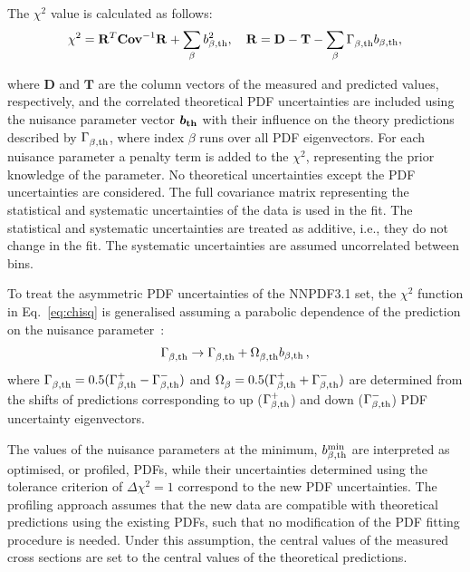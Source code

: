 \documentclass[pdftex,twocolumn,epjc3]{svjour3}          %
\newcommand{\nnpdf} {NNPDF3.1\xspace}
\newcommand{\chisq}{\ensuremath{\chi^2}\xspace}
\begin{document}
The \chisq value is calculated as follows:
\begin{equation}
\chisq = \mathbf{R}^{T}_{} \mathbf{Cov}^{-1}_{} \mathbf{R}_{} + \sum_{\beta} b_{\beta,\rm th}^2,~~~\mathbf{R} = \mathbf{D} - \mathbf{T} - \sum_{\beta} \Gamma^{}_{\beta,\rm th} b_{\beta,\rm th},
\label{eq:chisq}
\end{equation}

where $\mathbf{D}$ and $\mathbf{T}$ are the column vectors of the measured and predicted values, respectively, 
and the correlated theoretical PDF uncertainties are included using the nuisance parameter vector $\boldsymbol{b_{\rm th}}$ with their influence on the theory predictions described by $\Gamma^{}_{\beta,\rm th}$, where index $\beta$ runs over all PDF eigenvectors. 
For each nuisance parameter a penalty term is added to the \chisq, representing the prior knowledge of the parameter. 
No theoretical uncertainties except the PDF uncertainties are considered.
The full covariance matrix representing the statistical and systematic uncertainties of the data is used in the fit. The statistical and systematic uncertainties are treated as additive, i.e., they do not change in the fit. The systematic uncertainties are assumed uncorrelated between bins.

To treat the asymmetric PDF uncertainties of the \nnpdf set, the \chisq function in Eq.~\ref{eq:chisq} is generalised assuming a parabolic dependence of the prediction on the nuisance parameter~\cite{Alekhin:2014irh}:
\begin{eqnarray}
\Gamma^{}_{\beta, \rm th} \to \Gamma^{}_{\beta, \rm th} +  \Omega^{}_{\beta, \rm th}b_{\beta, \rm th}\,, \label{eq:iter}
\end{eqnarray}
where $\Gamma^{}_{\beta, \rm th} = 0.5(\Gamma^{+}_{\beta, \rm th} - \Gamma^{-}_{\beta, \rm th})$ and $\Omega^{}_{\beta} = 0.5(\Gamma^{+}_{\beta, \rm th}
+ \Gamma^{-}_{\beta, \rm th})$ are determined from the shifts of predictions corresponding to up ($\Gamma^{+}_{\beta, \rm th}$) and down ($ \Gamma^{-}_{\beta, \rm th}$) PDF uncertainty eigenvectors.

The values of the nuisance parameters at the minimum, $b^{\rm min}_{\beta,\rm th}$ are interpreted as optimised, or profiled, PDFs, while their uncertainties determined using the tolerance criterion of $\Delta\chi^2 = 1$ correspond to the new PDF uncertainties. The profiling approach assumes that the new data are compatible with theoretical predictions using the existing PDFs, such that no modification of the PDF fitting procedure is needed. Under this assumption, the central values of the measured cross sections are set to the central values of the theoretical predictions. 
\end{document}

